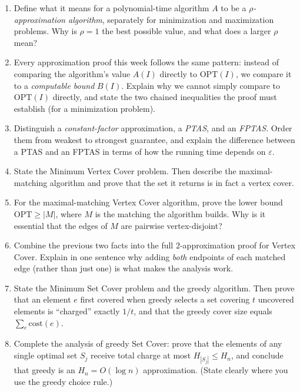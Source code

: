 \documentclass[11pt]{article}
\begin{document}
\begin{enumerate}[label=\textbf{A\arabic*.}, leftmargin=2.2em]

\item Define what it means for a polynomial-time algorithm $A$ to be a
\emph{$\rho$-approximation algorithm}, separately for minimization and maximization
problems. Why is $\rho = 1$ the best possible value, and what does a larger $\rho$ mean?

\item Every approximation proof this week follows the same pattern: instead of comparing
the algorithm's value $A(I)$ directly to $\mathrm{OPT}(I)$, we compare it to a
\emph{computable bound} $B(I)$. Explain why we cannot simply compare to
$\mathrm{OPT}(I)$ directly, and state the two chained inequalities the proof must
establish (for a minimization problem).

\item Distinguish a \emph{constant-factor} approximation, a \emph{PTAS}, and an
\emph{FPTAS}. Order them from weakest to strongest guarantee, and explain the difference
between a PTAS and an FPTAS in terms of how the running time depends on $\varepsilon$.

\item State the Minimum Vertex Cover problem. Then describe the maximal-matching algorithm
and prove that the set it returns is in fact a vertex cover.

\item For the maximal-matching Vertex Cover algorithm, prove the lower bound $\mathrm{OPT}
\ge |M|$, where $M$ is the matching the algorithm builds. Why is it essential that the
edges of $M$ are pairwise vertex-disjoint?

\item Combine the previous two facts into the full $2$-approximation proof for Vertex
Cover. Explain in one sentence why adding \emph{both} endpoints of each matched edge
(rather than just one) is what makes the analysis work.

\item State the Minimum Set Cover problem and the greedy algorithm. Then prove that an
element $e$ first covered when greedy selects a set covering $t$ uncovered elements is
``charged'' exactly $1/t$, and that the greedy cover size equals $\sum_{e} \mathrm{cost}(e)$.

\item Complete the analysis of greedy Set Cover: prove that the elements of any single
optimal set $S_j$ receive total charge at most $H_{|S_j|} \le H_n$, and conclude that
greedy is an $H_n = O(\log n)$ approximation. (State clearly where you use the greedy
choice rule.)


\end{enumerate}
\end{document}

